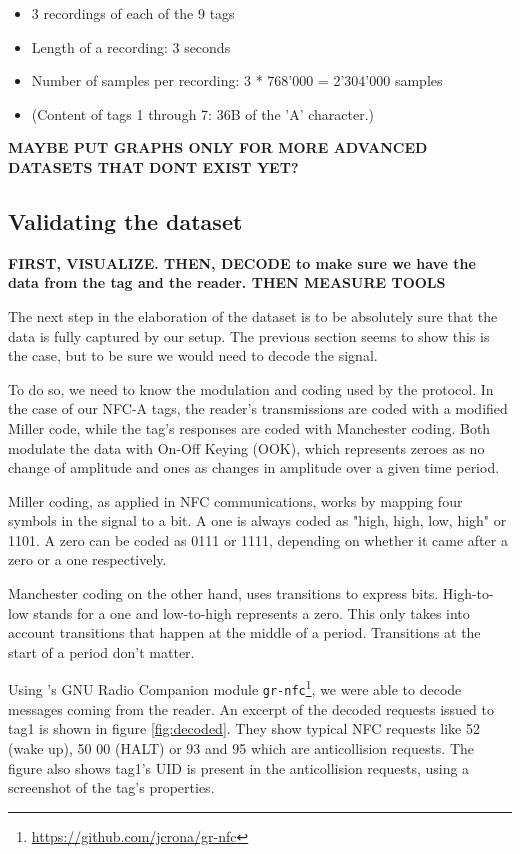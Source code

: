 \begin{itemize}
  \item 3 recordings of each of the 9 tags
  \item Length of a recording: 3 seconds
  \item Number of samples per recording: 3 * 768'000 = 2'304'000 samples
  \item (Content of tags 1 through 7: 36B of the 'A' character.)
\end{itemize}

\textbf{MAYBE PUT GRAPHS ONLY FOR MORE ADVANCED DATASETS THAT DONT EXIST YET?}

\subsection{Validating the dataset} \label{validation}

\textbf{FIRST, VISUALIZE. THEN, DECODE to make sure we have the data from the tag and the reader. THEN MEASURE TOOLS}

The next step in the elaboration of the dataset is to be absolutely sure that the data is fully captured by our setup. The previous section seems to show this is the case, but to be sure we would need to decode the signal.

To do so, we need to know the modulation and coding used by the protocol. In the case of our NFC-A tags, the reader's transmissions are coded with a modified Miller code, while the tag's responses are coded with Manchester coding. Both modulate the data with On-Off Keying (OOK), which represents zeroes as no change of amplitude and ones as changes in amplitude over a given time period. \cite{wiki_off_2020}

Miller coding, as applied in NFC communications, works by mapping four symbols in the signal to a bit. A one is always coded as "high, high, low, high" or 1101. A zero can be coded as 0111 or 1111, depending on whether it came after a zero or a one respectively. \cite{phy_nfc_coding}

Manchester coding on the other hand, uses transitions to express bits. High-to-low stands for a one and low-to-high represents a zero. This only takes into account transitions that happen at the middle of a period. Transitions at the start of a period don't matter. \cite{phy_nfc_coding, wiki_manchester_2019}

Using \textcite{rona_sniffing_2017}'s GNU Radio Companion module \texttt{gr-nfc}\footnote{\url{https://github.com/jcrona/gr-nfc}}, we were able to decode messages coming from the reader. An excerpt of the decoded requests issued to tag1 is shown in figure \ref{fig:decoded}. They show typical NFC requests like 52 (wake up), 50 00 (HALT) or 93 and 95 which are anticollision requests. The figure also shows tag1's UID is present in the anticollision requests, using a screenshot of the tag's properties.

